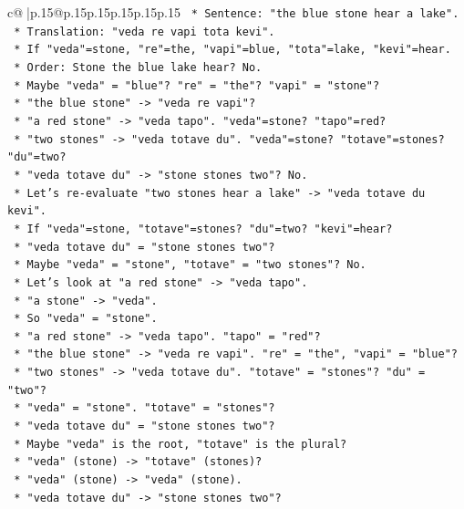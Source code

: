 \documentclass{article}
\begin{document}
{\begin{supertabular}{c@{$\;$}|p{.15\linewidth}@{}p{.15\linewidth}p{.15\linewidth}p{.15\linewidth}p{.15\linewidth}p{.15\linewidth}}
{{{\texttt{    *   Sentence: "the blue stone hear a lake".} \\
\texttt{    *   Translation: "veda re vapi tota kevi".} \\
\texttt{    *   If "veda"=stone, "re"=the, "vapi"=blue, "tota"=lake, "kevi"=hear.} \\
\texttt{    *   Order: Stone the blue lake hear? No.} \\
\texttt{    *   Maybe "veda" = "blue"? "re" = "the"? "vapi" = "stone"?} \\
\texttt{    *   "the blue stone" {-}> "veda re vapi"?} \\
\texttt{    *   "a red stone" {-}> "veda tapo". "veda"=stone? "tapo"=red?} \\
\texttt{    *   "two stones" {-}> "veda totave du". "veda"=stone? "totave"=stones? "du"=two?} \\
\texttt{    *   "veda totave du" {-}> "stone stones two"? No.} \\
\texttt{    *   Let's re{-}evaluate "two stones hear a lake" {-}> "veda totave du kevi".} \\
\texttt{    *   If "veda"=stone, "totave"=stones? "du"=two? "kevi"=hear?} \\
\texttt{    *   "veda totave du" = "stone stones two"?} \\
\texttt{    *   Maybe "veda" = "stone", "totave" = "two stones"? No.} \\
\texttt{    *   Let's look at "a red stone" {-}> "veda tapo".} \\
\texttt{    *   "a stone" {-}> "veda".} \\
\texttt{    *   So "veda" = "stone".} \\
\texttt{    *   "a red stone" {-}> "veda tapo". "tapo" = "red"?} \\
\texttt{    *   "the blue stone" {-}> "veda re vapi". "re" = "the", "vapi" = "blue"?} \\
\texttt{    *   "two stones" {-}> "veda totave du". "totave" = "stones"? "du" = "two"?} \\
\texttt{    *   "veda" = "stone". "totave" = "stones"?} \\
\texttt{    *   "veda totave du" = "stone stones two"?} \\
\texttt{    *   Maybe "veda" is the root, "totave" is the plural?} \\
\texttt{    *   "veda" (stone) {-}> "totave" (stones)?} \\
\texttt{    *   "veda" (stone) {-}> "veda" (stone).} \\
\texttt{    *   "veda totave du" {-}> "stone stones two"?} \\
}}}
\end{supertabular}}
\end{document}
